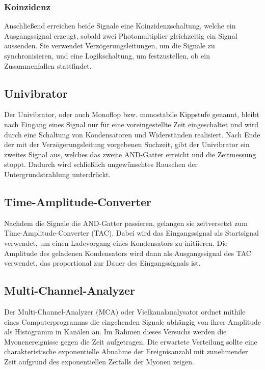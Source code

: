 \subsubsection*{Koinzidenz}
Anschließend erreichen beide Signale eine Koinzidenzschaltung, welche ein Ausgangssignal
erzeugt, sobald zwei Photomultiplier gleichzeitig ein Signal aussenden.
Sie verwendet Verzögerungsleitungen, um die Signale zu synchronisieren, und eine Logikschaltung, 
um festzustellen, ob ein Zusammenfallen stattfindet.

\subsection*{Univibrator}
Der Univibrator, oder auch Monoflop bzw. monostabile Kippstufe genannt,
bleibt nach Eingang eines Signal nur für eine voreingestellte Zeit eingeschaltet
und wird durch eine Schaltung von Kondensatoren und Widerständen realisiert.
Nach Ende der mit der Verzögerungsleitung vorgebenen Suchzeit, 
gibt der Univibrator ein zweites Signal aus,
welches das zweite AND-Gatter erreicht und die Zeitmessung stoppt.
Dadurch wird schließlich ungewünschtes Rauschen der Untergrundstrahlung unterdrückt.

\subsection*{Time-Amplitude-Converter}
Nachdem die Signale die AND-Gatter passieren, 
gelangen sie zeitversetzt zum Time-Amplitude-Converter (TAC).
Dabei wird das Eingangssignal als Startsignal verwendet, 
um einen Ladevorgang eines Kondensators zu initiieren. 
Die Amplitude des geladenen Kondensators wird dann als Ausgangssignal des TAC verwendet, 
das proportional zur Dauer des Eingangssignals ist.

\subsection*{Multi-Channel-Analyzer}
Der Multi-Channel-Analyzer (MCA) oder Vielkanalanalysator ordnet mithile eines Computerprogramms 
die eingehenden Signale abhängig von ihrer Amplitude als Histogramm in Kanälen an.
Im Rahmen dieses Versuchs werden die Myonenereignisse gegen die Zeit aufgetragen.
Die erwartete Verteilung sollte eine charakteristische exponentielle Abnahme der Ereignisanzahl mit 
zunehmender Zeit aufgrund des exponentiellen Zerfalls der Myonen zeigen.